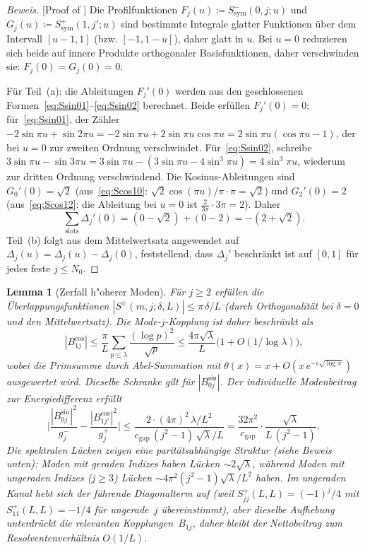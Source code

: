 \documentclass[12pt,a4paper]{article}
\newtheorem{lemma}[theorem]{Lemma}
\theoremstyle{definition}
\theoremstyle{remark}
\begin{document}
\begin{proof}[Beweis][Proof of ]
Die Profilfunktionen $F_j(u) \coloneqq S^-_{\mathrm{sym}}(0,j;u)$ und $G_j(u) \coloneqq S^+_{\mathrm{sym}}(1,j';u)$ sind bestimmte Integrale glatter Funktionen über dem Intervall $[u-1,1]$ (bzw. $[-1,1-u]$), daher glatt in $u$. Bei $u = 0$ reduzieren sich beide auf innere Produkte orthogonaler Basisfunktionen, daher verschwinden sie: $F_j(0) = G_j(0) = 0$.

Für Teil~(a): die Ableitungen $F_j'(0)$ werden aus den geschlossenen Formen~\eqref{eq:Ssin01}--\eqref{eq:Ssin02} berechnet. Beide erfüllen $F_j'(0) = 0$: für~\eqref{eq:Ssin01}, der Zähler $-2\sin\pi u + \sin 2\pi u = -2\sin\pi u + 2\sin\pi u\cos\pi u = 2\sin\pi u(\cos\pi u - 1)$, der bei $u = 0$ zur zweiten Ordnung verschwindet. Für~\eqref{eq:Ssin02}, schreibe $3\sin\pi u - \sin 3\pi u = 3\sin\pi u - (3\sin\pi u - 4\sin^3\pi u) = 4\sin^3\pi u$, wiederum zur dritten Ordnung verschwindend. Die Kosinus-Ableitungen sind $G_0'(0) = \sqrt{2}$ (aus~\eqref{eq:Scos10}: $\sqrt{2}\cos(\pi u)/\pi \cdot \pi = \sqrt{2}$) und $G_2'(0) = 2$ (aus~\eqref{eq:Scos12}: die Ableitung bei $u = 0$ ist $\tfrac{2}{3\pi}\cdot 3\pi = 2$). Daher
\[
  \sum_{\mathrm{slots}} \Delta_j'(0) = (0 - \sqrt{2}) + (0 - 2) = -(2 + \sqrt{2}).
\]
Teil~(b) folgt aus dem Mittelwertsatz angewendet auf $\Delta_j(u) = \Delta_j(u) - \Delta_j(0)$, feststellend, dass $\Delta_j'$ beschränkt ist auf $[0,1]$ für jedes feste $j \leq N_0$.
\end{proof}

\begin{lemma}[Zerfall h"oherer Moden]
\label{lem:higher-mode-decay}
Für $j \geq 2$ erfüllen die Überlappungsfunktionen $|S^{\pm}(m,j;\delta,L)| \leq \pi\,\delta/L$ (durch Orthogonalität bei $\delta = 0$ und den Mittelwertsatz). Die Mode-$j$-Kopplung ist daher beschränkt als
\[
  |B_{1j}^{\cos}| \leq \frac{\pi}{L}\sum_{p \leq \lambda}\frac{(\log p)^2}{\sqrt{p}}
  \leq \frac{4\pi\sqrt{\lambda}}{L}\bigl(1 + O(1/\log\lambda)\bigr),
\]
wobei die Primsumme durch Abel-Summation mit $\theta(x) = x + O(x\,e^{-c\sqrt{\log x}})$ ausgewertet wird. Dieselbe Schranke gilt für $|B_{0j}^{\sin}|$. Der individuelle Modenbeitrag zur Energiedifferenz erfüllt
\[
  \biggl|\frac{|B_{0j}^{\sin}|^2}{g_j^-} - \frac{|B_{1j'}^{\cos}|^2}{g_j^+}\biggr|
  \leq \frac{2 \cdot (4\pi)^2 \,\lambda/L^2}{c_{\mathrm{gap}}\,(j^2-1)\,\sqrt{\lambda}/L}
  = \frac{32\pi^2}{c_{\mathrm{gap}}}\cdot\frac{\sqrt{\lambda}}{L\,(j^2-1)},
\]
Die spektralen Lücken zeigen eine \emph{paritätsabhängige} Struktur (siehe Beweis unten): Moden mit geraden Indizes haben Lücken $\sim 2\sqrt{\lambda}$, während Moden mit ungeraden Indizes ($j \geq 3$) Lücken $\sim 4\pi^2(j^2-1)\sqrt{\lambda}/L^2$ haben. Im ungeraden Kanal hebt sich der führende Diagonalterm auf (weil $S_{jj}^+(L,L) = (-1)^j/4$ mit $S_{11}^+(L,L) = -1/4$ für ungerade~$j$ übereinstimmt), aber dieselbe Aufhebung unterdrückt die relevanten Kopplungen~$B_{1j}$, daher bleibt der Nettobeitrag zum Resolventenverhältnis $O(1/L)$.
\end{lemma}
\end{document}

